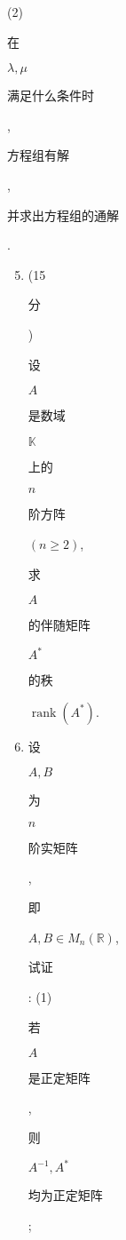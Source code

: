 \documentclass[10pt]{article}
\begin{document}
(2) \begin{CJK}{UTF8}{mj}在\end{CJK} $\lambda, \mu$ \begin{CJK}{UTF8}{mj}满足什么条件时\end{CJK}, \begin{CJK}{UTF8}{mj}方程组有解\end{CJK}, \begin{CJK}{UTF8}{mj}并求出方程组的通解\end{CJK}.

\begin{enumerate}
  \setcounter{enumi}{4}
  \item (15 \begin{CJK}{UTF8}{mj}分\end{CJK}) \begin{CJK}{UTF8}{mj}设\end{CJK} $A$ \begin{CJK}{UTF8}{mj}是数域\end{CJK} $\mathbb{K}$ \begin{CJK}{UTF8}{mj}上的\end{CJK} $n$ \begin{CJK}{UTF8}{mj}阶方阵\end{CJK} $(n \geqslant 2)$, \begin{CJK}{UTF8}{mj}求\end{CJK} $A$ \begin{CJK}{UTF8}{mj}的伴随矩阵\end{CJK} $A^{*}$ \begin{CJK}{UTF8}{mj}的秩\end{CJK} $\operatorname{rank}\left(A^{*}\right)$.

  \item \begin{CJK}{UTF8}{mj}设\end{CJK} $A, B$ \begin{CJK}{UTF8}{mj}为\end{CJK} $n$ \begin{CJK}{UTF8}{mj}阶实矩阵\end{CJK}, \begin{CJK}{UTF8}{mj}即\end{CJK} $A, B \in M_{n}(\mathbb{R})$, \begin{CJK}{UTF8}{mj}试证\end{CJK}: (1) \begin{CJK}{UTF8}{mj}若\end{CJK} $A$ \begin{CJK}{UTF8}{mj}是正定矩阵\end{CJK}, \begin{CJK}{UTF8}{mj}则\end{CJK} $A^{-1}, A^{*}$ \begin{CJK}{UTF8}{mj}均为正定矩阵\end{CJK};

\end{enumerate}
\end{document}
